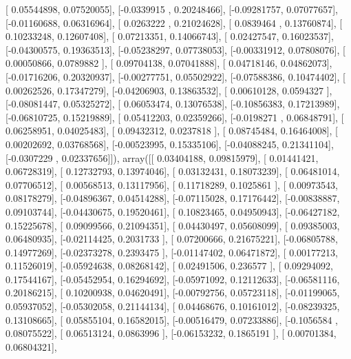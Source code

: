 \documentclass{article}
\begin{document}
       [ 0.05544898,  0.07520055],
       [-0.0339915 ,  0.20248466],
       [-0.09281757,  0.07077657],
       [-0.01160688,  0.06316964],
       [ 0.0263222 ,  0.21024628],
       [ 0.0839464 ,  0.13760874],
       [ 0.10233248,  0.12607408],
       [ 0.07213351,  0.14066743],
       [ 0.02427547,  0.16023537],
       [-0.04300575,  0.19363513],
       [-0.05238297,  0.07738053],
       [-0.00331912,  0.07808076],
       [ 0.00050866,  0.0789882 ],
       [ 0.09704138,  0.07041888],
       [ 0.04718146,  0.04862073],
       [-0.01716206,  0.20320937],
       [-0.00277751,  0.05502922],
       [-0.07588386,  0.10474402],
       [ 0.00262526,  0.17347279],
       [-0.04206903,  0.13863532],
       [ 0.00610128,  0.0594327 ],
       [-0.08081447,  0.05325272],
       [ 0.06053474,  0.13076538],
       [-0.10856383,  0.17213989],
       [-0.06810725,  0.15219889],
       [ 0.05412203,  0.02359266],
       [-0.0198271 ,  0.06848791],
       [ 0.06258951,  0.04025483],
       [ 0.09432312,  0.0237818 ],
       [ 0.08745484,  0.16464008],
       [ 0.00202692,  0.03768568],
       [-0.00523995,  0.15335106],
       [-0.04088245,  0.21341104],
       [-0.0307229 ,  0.02337656]]), array([[ 0.03404188,  0.09815979],
       [ 0.01441421,  0.06728319],
       [ 0.12732793,  0.13974046],
       [ 0.03132431,  0.18073239],
       [ 0.06481014,  0.07706512],
       [ 0.00568513,  0.13117956],
       [ 0.11718289,  0.1025861 ],
       [ 0.00973543,  0.08178279],
       [-0.04896367,  0.04514288],
       [-0.07115028,  0.17176442],
       [-0.00838887,  0.09103744],
       [-0.04430675,  0.19520461],
       [ 0.10823465,  0.04950943],
       [-0.06427182,  0.15225678],
       [ 0.09099566,  0.21094351],
       [ 0.04430497,  0.05608099],
       [ 0.09385003,  0.06480935],
       [-0.02114425,  0.2031733 ],
       [ 0.07200666,  0.21675221],
       [-0.06805788,  0.14977269],
       [-0.02373278,  0.2393475 ],
       [-0.01147402,  0.06471872],
       [ 0.00177213,  0.11526019],
       [-0.05924638,  0.08268142],
       [ 0.02491506,  0.236577  ],
       [ 0.09294092,  0.17544167],
       [-0.05452954,  0.16294692],
       [-0.05971092,  0.12112633],
       [-0.06581116,  0.20186215],
       [ 0.10200938,  0.04620491],
       [-0.00792756,  0.05723118],
       [-0.01199065,  0.05937052],
       [-0.05302058,  0.21144134],
       [ 0.04468676,  0.10161012],
       [-0.08239325,  0.13108665],
       [ 0.05855104,  0.16582015],
       [-0.00516479,  0.07233886],
       [-0.1056584 ,  0.08075522],
       [ 0.06513124,  0.0863996 ],
       [-0.06153232,  0.1865191 ],
       [ 0.00701384,  0.06804321],
\end{document}
